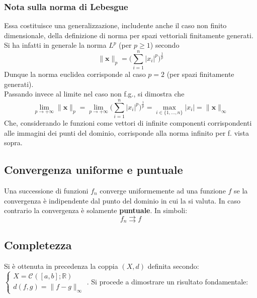 \documentclass[10pt, oneside]{book}
\theoremstyle{plain}
\begin{document}
\subsubsection{Nota sulla norma di Lebesgue} Essa costituisce una generalizzazione, includente anche il caso non finito dimensionale, della definizione di norma per spazi vettoriali finitamente generati. Si ha infatti in generale la norma $\mathit{L}^p$ (per $p \geq 1$) secondo
\[\|\mathbf{x}\|_{p} = \big(\sum\limits_{i=1}^n |x_i|^p\big)^{\frac{1}{p}}\]
Dunque la norma euclidea corrisponde al caso $p = 2$ (per spazi finitamente generati).
\\Passando invece al limite nel caso non f.g., si dimostra che 
\[\lim\limits_{p \rightarrow +\infty} \|\mathbf{x}\|_p = \lim\limits_{p \rightarrow +\infty}\big(\sum\limits_{i=1}^n |x_i|^p\big)^{\frac{1}{p}} = \max\limits_{i \in \{1, ..., n\}} |x_i| = \|\mathbf{x}\|_\infty\]
Che, considerando le funzioni come vettori di infinite componenti corrispondenti alle immagini dei punti del dominio, corrisponde alla norma infinito per f. vista sopra.

\subsection{Convergenza uniforme e puntuale}
\begin{defin}
	Una successione di funzioni $f_n$ converge uniformemente ad una funzione $f$ se la convergenza è indipendente dal punto del dominio in cui la si valuta. In caso contrario la convergenza è solamente \textbf{puntuale}. In simboli:
	\[f_n \rightrightarrows f\]
\end{defin}

\subsection{Completezza} Si è ottenuta in precedenza la coppia $(X,d)$ definita secondo: $\displaystyle \begin{cases}
X = \mathcal{C}^{}([a,b] ; \mathbb{R})\\
d(f,g) = \|f - g\|_\infty
\end{cases}$. Si procede a dimostrare un risultato fondamentale:
\end{document}
